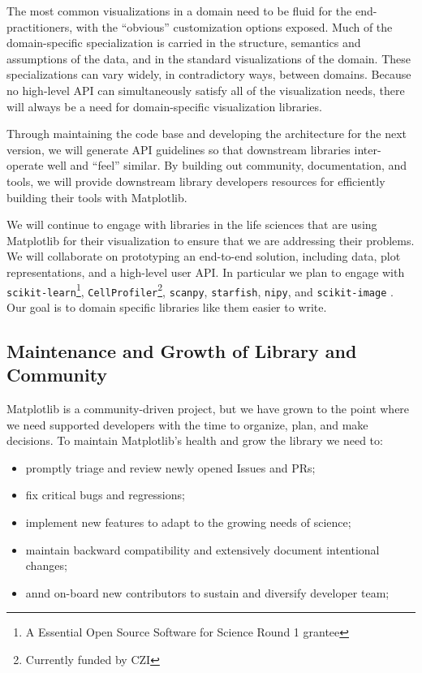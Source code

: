 \documentclass[12pt,letterpaper]{article}  %
\begin{document}
The most common visualizations in a domain need to be fluid for
the end-practitioners, with the ``obvious'' customization options
exposed. Much of the domain-specific specialization is carried in the
structure, semantics and assumptions of the data, and in the standard
visualizations of the domain. These specializations can vary widely,
in contradictory ways, between domains. Because no high-level API can
simultaneously satisfy all of the visualization needs, there will
always be a need for domain-specific visualization libraries.

Through maintaining the code base and developing the architecture for
the next version, we will generate API guidelines so that downstream
libraries inter-operate well and ``feel'' similar. By building out
community, documentation, and tools, we will provide downstream
library developers resources for efficiently building their tools with
Matplotlib.

We will continue to engage with libraries in the life sciences that
are using Matplotlib for their visualization to ensure that we are
addressing their problems. We will collaborate on prototyping an
end-to-end solution, including data, plot representations, and a
high-level user API.  In particular we plan to engage with
\texttt{scikit-learn}\footnote{A Essential Open Source Software for
Science Round 1 grantee}, \texttt{CellProfiler}\footnote{Currently
funded by CZI\label{f:czi}}, \texttt{scanpy},
\texttt{starfish}, \texttt{nipy}, and
\texttt{scikit-image}
\cite{10.7717/peerj.453,Carpenter2006, Wolf2018}.  Our goal is to
domain specific libraries like them easier to write.

\subsection{Maintenance and Growth of Library and Community}

Matplotlib is a community-driven project, but we have grown to the
point where we need supported developers with the time to organize,
plan, and make decisions.  To maintain Matplotlib's health and grow
the library we need to:

\begin{itemize}[noitemsep]
\item promptly triage and review newly opened Issues and PRs;
\item fix critical bugs and regressions;
\item implement new features to adapt to the growing needs of science;
\item maintain backward compatibility and extensively document intentional changes;
\item annd on-board new contributors to sustain and diversify developer team;
\end{itemize}
\end{document}
